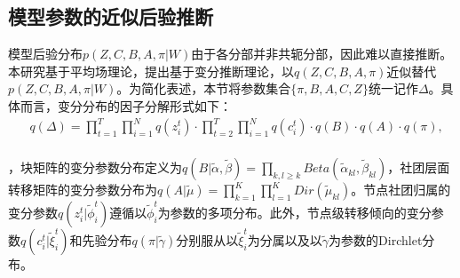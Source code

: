 \subsection{模型参数的近似后验推断}

模型后验分布$p(Z, C, B, A, \pi | W)$由于各分部并非共轭分部，因此难以直接推断。本研究基于平均场理论，提出基于变分推断理论，以$q(Z, C, B, A, \pi)$近似替代$p(Z, C, B, A, \pi | W)$。为简化表述，本节将参数集合$\{\pi, B, A, C, Z\}$统一记作$\Delta$。具体而言，变分分布的因子分解形式如下：
\begin{equation}
\label{eq2}
\begin{split}
& q(\Delta) = \prod_{t=1}^T \prod_{i=1}^N q(z_i^t) \cdot \prod_{t=2}^T \prod_{i=1}^N q(c_i^t) \cdot q(B) \cdot q(A) \cdot q(\pi) , \\
\end{split}
\end{equation}

，块矩阵的变分参数分布定义为$q(B | \widetilde{\alpha}, \widetilde{\beta}) = \prod_{k,l \geq k} Beta(\widetilde{\alpha}_{kl}, \widetilde{\beta}_{kl})$，社团层面转移矩阵的变分参数分布为$q(A | \widetilde{\mu}) = \prod_{k=1}^K \prod_{l=1}^K Dir(\widetilde{\mu}_{kl})$。节点社团归属的变分参数$q(z_i^t | \widetilde{\phi}_i^t)$遵循以$\widetilde{\phi}_i^t$为参数的多项分布。此外，节点级转移倾向的变分参数$q(c_i^t | \widetilde{\xi}_i^t)$和先验分布$q(\pi | \widetilde{\gamma})$分别服从以$\widetilde{\xi}_i^t$为分属以及以$\widetilde{\gamma}$为参数的Dirchlet分布。




